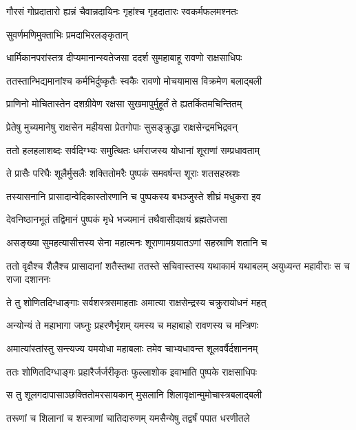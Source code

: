 \twolineshloka
{गौरसं गोप्रदातारो ह्यन्नं चैवान्नदायिनः}
{गृहांश्च गृहदातारः स्वकर्मफलमश्नतः} %

\onelineshloka
{सुवर्णमणिमुक्ताभिः प्रमदाभिरलङ्कृतान्} %

\twolineshloka
{धार्मिकानपरांस्तत्र दीप्यमानान्स्वतेजसा}
{ददर्श सुमहाबाहू रावणो राक्षसाधिपः} %

\twolineshloka
{ततस्तान्भिद्यमानांश्च कर्मभिर्दुष्कृतैः स्वकैः}
{रावणो मोचयामास विक्रमेण बलाद्बली} %

\twolineshloka
{प्राणिनो मोचितास्तेन दशग्रीवेण रक्षसा}
{सुखमापुर्मुहूर्तं ते ह्यतर्कितमचिन्तितम्} %

\twolineshloka
{प्रेतेषु मुच्यमानेषु राक्षसेन महीयसा}
{प्रेतगोपाः सुसङ्क्रुद्धा राक्षसेन्द्रमभिद्रवन्} %

\twolineshloka
{ततो हलहलाशब्दः सर्वदिग्भ्यः समुत्थितः}
{धर्मराजस्य योधानां शूराणां सम्प्रधावताम्} %

\twolineshloka
{ते प्रासैः परिघैः शूलैर्मुसलैः शक्तितोमरैः}
{पुष्पकं समवर्षन्त शूराः शतसहस्रशः} %

\twolineshloka
{तस्यासनानि प्रासादान्वेदिकास्तोरणानि च}
{पुष्पकस्य बभञ्जुस्ते शीघ्रं मधुकरा इव} %

\twolineshloka
{देवनिष्ठानभूतं तद्विमानं पुष्पकं मृधे}
{भज्यमानं तथैवासीदक्षयं ब्रह्मतेजसा} %

\twolineshloka
{असङ्ख्या सुमहत्यासीत्तस्य सेना महात्मनः}
{शूराणामग्रयातऽणां सहस्राणि शतानि च} %

\threelineshloka
{ततो वृक्षैश्च शैलैश्च प्रासादानां शतैस्तथा}
{ततस्ते सचिवास्तस्य यथाकामं यथाबलम्}
{अयुध्यन्त महावीराः स च राजा दशाननः} %

\twolineshloka
{ते तु शोणितदिग्धाङ्गाः सर्वशस्त्रसमाहताः}
{अमात्या राक्षसेन्द्रस्य चक्रुरायोधनं महत्} %

\twolineshloka
{अन्योन्यं ते महाभागा जघ्नुः प्रहरणैर्भृशम्}
{यमस्य च महाबाहो रावणस्य च मन्त्रिणः} %

\twolineshloka
{अमात्यांस्तांस्तु सन्त्यज्य यमयोधा महाबलाः}
{तमेव चाभ्यधावन्त शूलवर्षैर्दशाननम्} %

\twolineshloka
{ततः शोणितदिग्धाङ्गः प्रहारैर्जर्जरीकृतः}
{फुल्लाशोक इवाभाति पुष्पके राक्षसाधिपः} %

\twolineshloka
{स तु शूलगदापासाञ्छक्तितोमरसायकान्}
{मुसलानि शिलावृक्षान्मुमोचास्त्रबलाद्बली} %

\twolineshloka
{तरूणां च शिलानां च शस्त्राणां चातिदारुणम्}
{यमसैन्येषु तद्वर्षं पपात धरणीतले} %

